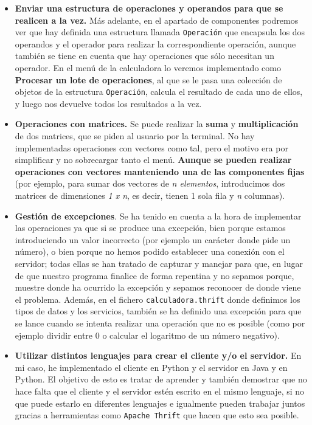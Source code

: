 \documentclass[a4paper,12pt]{article}
\begin{document}
			\begin{itemize}
				\item \textbf{Enviar una estructura de operaciones y operandos para que se realicen a la vez.} Más adelante, en el apartado de componentes podremos ver que hay definida una estructura llamada \texttt{Operación} que encapsula los dos operandos y el operador para realizar la correspondiente operación, aunque también se tiene en cuenta que hay operaciones que sólo necesitan un operador. En el menú de la calculadora lo veremos implementado como \textbf{Procesar un lote de operaciones}, al que se le pasa una colección de objetos de la estructura \texttt{Operación}, calcula el resultado de cada uno de ellos, y luego nos devuelve todos los resultados a la vez.
				
				\item \textbf{Operaciones con  matrices.} Se puede realizar la \textbf{suma} y \textbf{multiplicación} de dos matrices, que se piden al usuario por la terminal. No hay implementadas operaciones con vectores como tal, pero el motivo era por simplificar y no sobrecargar tanto el menú. \textbf{Aunque se pueden realizar operaciones con vectores manteniendo una de las componentes fijas} (por ejemplo, para sumar dos vectores de \textit{n elementos}, introducimos dos matrices de dimensiones \textit{1 x n}, es decir, tienen 1 sola fila y \textit{n} columnas).
				
				\item \textbf{Gestión de excepciones}. Se ha tenido en cuenta a la hora de implementar las operaciones ya que si se produce una excepción, bien porque estamos introduciendo un valor incorrecto (por ejemplo un carácter donde pide un número), o bien porque no hemos podido establecer una conexión con el servidor; todas ellas se han tratado de capturar y manejar para que, en lugar de que nuestro programa finalice de forma repentina y no sepamos porque, muestre donde ha ocurrido la excepción y sepamos reconocer de donde viene el problema. Además, en el fichero \texttt{calculadora.thrift} donde definimos los tipos de datos y los servicios, también se ha definido una excepción para que se lance cuando se intenta realizar una operación que no es posible (como por ejemplo dividir entre 0 o calcular el logaritmo de un número negativo).
				
				\item \textbf{Utilizar distintos lenguajes para crear el cliente y/o el servidor.} En mi caso, he implementado el cliente en Python y el servidor en Java y en Python. El objetivo de esto es tratar de aprender y también demostrar que no hace falta que el cliente y el servidor estén escrito en el mismo lenguaje, si no que puede estarlo en diferentes lenguajes e igualmente pueden trabajar juntos gracias a herramientas como \texttt{Apache Thrift} que hacen que esto sea posible.
				

\end{itemize}
\end{document}
